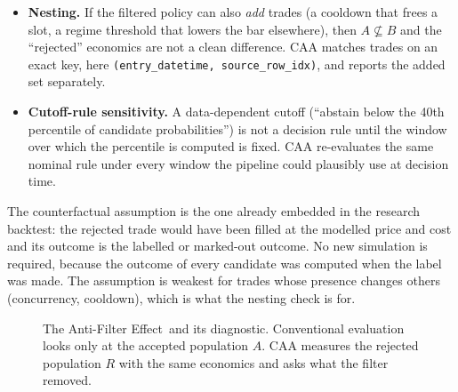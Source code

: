 \documentclass[10pt]{article}
\newcommand{\AF}{Anti-Filter Effect}
\begin{document}
\begin{itemize}\setlength{\itemsep}{0pt}
\item \textbf{Nesting.} If the filtered policy can also \emph{add} trades (a cooldown that frees a slot, a regime threshold that lowers the bar elsewhere), then $A\not\subseteq B$ and the ``rejected'' economics are not a clean difference. CAA matches trades on an exact key, here \texttt{(entry\_datetime, source\_row\_idx)}, and reports the added set separately.
\item \textbf{Cutoff-rule sensitivity.} A data-dependent cutoff (``abstain below the 40th percentile of candidate probabilities'') is not a decision rule until the window over which the percentile is computed is fixed. CAA re-evaluates the same nominal rule under every window the pipeline could plausibly use at decision time.
\end{itemize}

The counterfactual assumption is the one already embedded in the research backtest: the rejected trade would have been filled at the modelled price and cost and its outcome is the labelled or marked-out outcome. No new simulation is required, because the outcome of every candidate was computed when the label was made. The assumption is weakest for trades whose presence changes others (concurrency, cooldown), which is what the nesting check is for.

\begin{figure}[t]
\centering
{}
\caption{The \AF\ and its diagnostic. Conventional evaluation looks only at the accepted population $A$. CAA measures the rejected population $R$ with the same economics and asks what the filter removed.}
\label{fig:schematic}
\end{figure}
\end{document}
